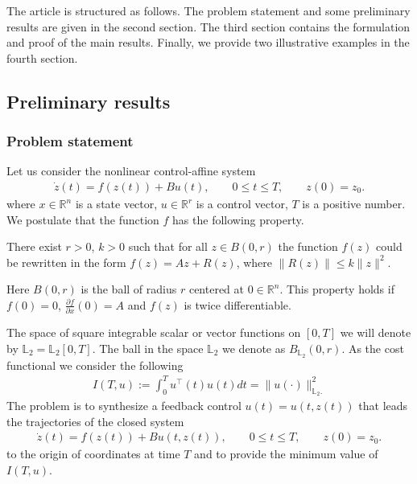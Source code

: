 \documentclass[../main.tex]{subfiles}
\begin{document}
The article is structured as follows. The problem statement and some preliminary results are given in the second section. The third section contains the formulation and proof of the main results. Finally, we provide two illustrative examples in the fourth section.

\subsection{Preliminary results}
\subsubsection{Problem statement}

Let us consider the nonlinear  control-affine system
\begin{gather}\label{nonlinear}
	\dot{z}(t)=f(z(t))+B u(t),\qquad 0 \leqslant t \leqslant T, \qquad z(0) = z_0.
\end{gather}
 where $ x \in \mathbb{R}^n $ is a state vector, $ u \in \mathbb{R}^r $ is a control vector,  $ 
T$ is a positive number. We postulate that the function $f$ has the following property. 
\begin{property}\label{prop:Residial_term_bounds}
	 There exist  $r>0$, $k>0$  such that for all $ z \in B(0,r) $ the function $f(z)$ could be rewritten in the form $ f(z) = Az + R(z) $, where  $ \|R(z) \| \leqslant k \| z\|^2  $. 
\end{property}
Here $ B(0,r) $ is the ball of radius $r$  centered at $0 \in \mathbb{R}^n$. 
This property holds if $f(0) = 0 $, $\frac{\partial f}{\partial x}(0) 
= A $ and $f(z)$ is twice differentiable. 

The space of square integrable scalar or vector functions on $ [0,T] $ we will denote by $ \mathbb{L}_2 = \mathbb{L}_2[0,T] $. The ball in the space $\mathbb{L}_2$ we denote as $B_{\mathbb{L}_2}(0,r)$. As the cost functional we consider the following
\begin{gather}\label{cost}
		I(T,u):=\int_0^Tu^\top (t)u(t)dt= 	\lVert u(\cdot)\rVert^2_{\mathbb{L}_2.} 
\end{gather}
The problem is to synthesize a feedback control $u(t)=u(t,z(t))$ that leads the trajectories of the closed system 
\begin{gather*}
	\dot{z}(t)=f(z(t))+B u(t,z(t)),\qquad 0 \leqslant t \leqslant T, \qquad z(0) = z_0.
\end{gather*}
to the origin of coordinates at  time $T$ and to provide the minimum value of $I(T,u)$. 
\end{document}
